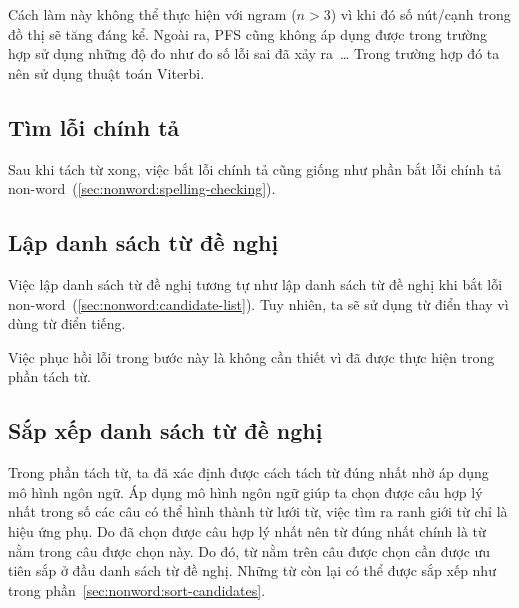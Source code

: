 \documentclass[a4paper,oneside,14pt]{extbook} %
\begin{document}
Cách làm này không thể thực hiện với ngram ($n > 3$) vì khi đó số
nút/cạnh trong đồ thị sẽ tăng đáng kể. Ngoài ra, PFS cũng không áp
dụng được trong trường hợp sử dụng những độ đo như đo số lỗi sai đã
xảy ra~\ldots{} Trong trường hợp đó ta nên sử dụng thuật toán
Viterbi.


\subsection{Tìm lỗi chính tả}
\label{sec:realword:spelling-checking}

Sau khi tách từ xong, việc bắt lỗi chính tả cũng giống như phần bắt
lỗi chính tả non-word~(\ref{sec:nonword:spelling-checking}).

\subsection{Lập danh sách từ đề nghị}
\label{sec:realword:candidate-list}

Việc lập danh sách từ đề nghị tương tự như lập danh sách từ đề nghị
khi bắt lỗi non-word~(\ref{sec:nonword:candidate-list}). Tuy nhiên, ta
sẽ sử dụng từ điển thay vì dùng từ điển tiếng.

Việc phục hồi lỗi trong bước này là không cần thiết vì đã được thực
hiện trong phần tách từ.






\subsection{Sắp xếp danh sách từ đề nghị}
\label{sec:realword:sort-candidates}

Trong phần tách từ, ta đã xác định được cách tách từ đúng nhất nhờ áp
dụng mô hình ngôn ngữ. Áp dụng mô hình ngôn ngữ giúp ta chọn được câu
hợp lý nhất trong số các câu có thể hình thành từ lưới từ, việc tìm ra
ranh giới từ chỉ là hiệu ứng phụ. Do đã chọn được câu hợp lý nhất nên
từ đúng nhất chính là từ nằm trong câu được chọn này. Do đó, từ nằm
trên câu được chọn cần được ưu tiên sắp ở đầu danh sách từ đề
nghị. Những từ còn lại có thể được sắp xếp như trong
phần~\ref{sec:nonword:sort-candidates}.
\end{document}
